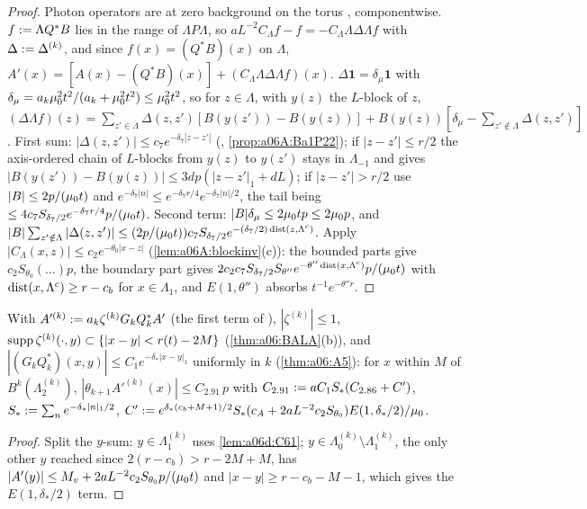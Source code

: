 \begin{proof}
Photon operators are at zero background on the torus \cite[p.~608]{Ba1}, componentwise. $f:=\Lambda Q^*B$ lies in the range of $\Lambda P\Lambda$, so $aL^{-2}C_\Lambda f-f=-C_\Lambda\Lambda\Delta\Lambda f$ with $\Delta:=\Delta^{(k)}$, and since $f(x)=(Q^*B)(x)$ on $\Lambda$, $A'(x)=[A(x)-(Q^*B)(x)]+(C_\Lambda\Lambda\Delta\Lambda f)(x)$. $\Delta\mathbf 1=\delta_\mu\mathbf 1$ with $\delta_\mu=a_k\mu_0^2t^2/(a_k+\mu_0^2t^2)\le\mu_0^2t^2$, so for $z\in\Lambda$, with $y(z)$ the $L$-block of $z$, $(\Delta\Lambda f)(z)=\sum_{z'\in\Lambda}\Delta(z,z')[B(y(z'))-B(y(z))]+B(y(z))[\delta_\mu-\sum_{z'\notin\Lambda}\Delta(z,z')]$. First sum: $|\Delta(z,z')|\le c_7e^{-\delta_7|z-z'|}$ (\cite[(2.27)]{Ba1}, \cref{prop:a06A:Ba1P22}); if $|z-z'|\le r/2$ the axis-ordered chain of $L$-blocks from $y(z)$ to $y(z')$ stays in $\Lambda_{-1}$ and \cite[(2.17)]{Ba2} gives $|B(y(z'))-B(y(z))|\le3dp(|z-z'|_1+dL)$; if $|z-z'|>r/2$ use $|B|\le2p/(\mu_0 t)$ and $e^{-\delta_7|n|}\le e^{-\delta_7r/4}e^{-\delta_7|n|/2}$, the tail being $\le4c_7S_{\delta_7/2}e^{-\delta_7r/4}p/(\mu_0 t)$. Second term: $|B|\delta_\mu\le2\mu_0 tp\le2\mu_0 p$, and $|B|\sum_{z'\notin\Lambda}|\Delta(z,z')|\le(2p/(\mu_0 t))c_7S_{\delta_7/2}e^{-(\delta_7/2)\operatorname{dist}(z,\Lambda^c)}$. Apply $|C_\Lambda(x,z)|\le c_2e^{-\theta_0|x-z|}$ (\cref{lem:a06A:blockinv}(c)): the bounded parts give $c_2S_{\theta_0}(\dots)p$, the boundary part gives $2c_2c_7S_{\delta_7/2}S_{\theta''}e^{-\theta''\operatorname{dist}(x,\Lambda^c)}p/(\mu_0 t)$ with $\operatorname{dist}(x,\Lambda^c)\ge r-c_b$ for $x\in\Lambda_1$, and $E(1,\theta'')$ absorbs $t^{-1}e^{-\theta''r}$.
\end{proof}

\begin{lemma}\label{lem:a06d:C62}
With $A'^{(k)}:= a_k\zeta^{(k)}G_kQ_k^*A'$ (the first term of \cite[(2.89)]{Ba2}), $|\zeta^{(k)}|\le1$, $\operatorname{supp}\zeta^{(k)}(\cdot,y)\subset\{|x-y|<r(t)-2M\}$ (\cref{thm:a06:BALA}(b)), and $|(G_kQ_k^*)(x,y)|\le C_1e^{-\delta_*|x-y|_1}$ uniformly in $k$ (\cref{thm:a06:A5}): for $x$ within $M$ of $B^k(\Lambda^{(k)}_2)$, $|\theta_{k+1}A'^{(k)}(x)|\le C_{2.91}\,p$ with $C_{2.91}:= aC_1S_*(C_{2.86}+C')$, $S_*:=\sum_ne^{-\delta_*|n|_1/2}$, $C':= e^{\delta_*(c_b+M+1)/2}S_*(c_A+2aL^{-2}c_2S_{\theta_0})E(1,\delta_*/2)/\mu_0$.
\end{lemma}

\begin{proof}
Split the $y$-sum: $y\in\Lambda^{(k)}_1$ uses \cref{lem:a06d:C61}; $y\in\Lambda^{(k)}_0\setminus\Lambda^{(k)}_1$, the only other $y$ reached since $2(r-c_b)>r-2M+M$, has $|A'(y)|\le M_v+2aL^{-2}c_2S_{\theta_0}p/(\mu_0 t)$ and $|x-y|\ge r-c_b-M-1$, which gives the $E(1,\delta_*/2)$ term.
\end{proof}

